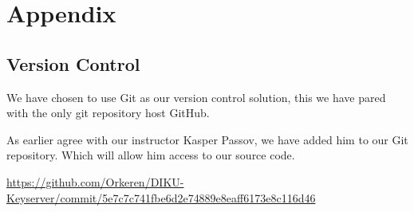 \documentclass[11pt,a4paper]{report}
\begin{document}
%
%
%
%
%
%
%
%
%
%
%
%

\newpage
\section{Appendix}
\subsection{Version Control}

We have chosen to use Git as our version control solution, this we have pared with the only git repository host GitHub.

As earlier agree with our instructor Kasper Passov, we have added him to our Git repository. Which will allow him access to our source code.

\urldef{\appendixoneone}\url{https://github.com/Orkeren/DIKU-Keyserver/commit/5e7c7c741fbe6d2e74889e8eaff6173e8c116d46}
\appendixoneone
\end{document}
